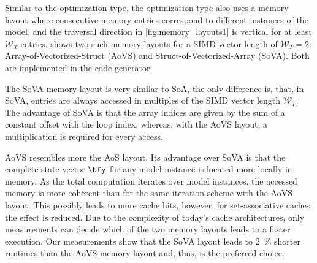 Similar to the  optimization type, the  optimization type also uses a memory layout where consecutive memory entries correspond to different instances of the model, and the traversal direction in \cref{fig:memory_layouts1} is vertical for at least $\mathcal{W}_T$ entries.  shows two such memory layouts for a SIMD vector length of $\mathcal{W}_T=2$: Array-of-Vectorized-Struct (AoVS) and Struct-of-Vectorized-Array (SoVA). Both are implemented in the code generator. 

The SoVA memory layout is very similar to SoA, the only difference is, that, in SoVA, entries are always accessed in multiples of the SIMD vector length $\mathcal{W}_T$. The advantage of SoVA is that the array indices are given by the sum of a constant offset with the loop index, whereas, with the AoVS layout, a multiplication is required for every access.

AoVS resembles more the AoS layout. Its advantage over SoVA is that the complete state vector $\bfy$ for any model instance is located more locally in memory. As the total computation iterates over model instances, the accessed memory is more coherent than for the same iteration scheme with the AoVS layout. This possibly leads to more cache hits, however, for set-associative caches, the effect is reduced. Due to the complexity of today's cache architectures, only measurements can decide which of the two memory layouts leads to a faster execution. Our measurements show that the SoVA layout leads to \SI{2}{\percent} shorter runtimes than the AoVS memory layout and, thus, is the preferred choice.



% 

